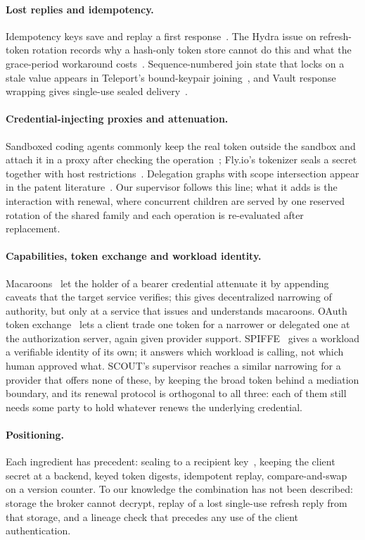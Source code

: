 \documentclass[11pt]{article}
\begin{document}
\paragraph{Lost replies and idempotency.} Idempotency keys save and replay a first response~\cite{stripe}. The Hydra issue on refresh-token rotation records why a hash-only token store cannot do this and what the grace-period workaround costs~\cite{hydra1831}. Sequence-numbered join state that locks on a stale value appears in Teleport's bound-keypair joining~\cite{teleport}, and Vault response wrapping gives single-use sealed delivery~\cite{vaultwrap}.

\paragraph{Credential-injecting proxies and attenuation.} Sandboxed coding agents commonly keep the real token outside the sandbox and attach it in a proxy after checking the operation~\cite{anthropicsandbox}; Fly.io's tokenizer seals a secret together with host restrictions~\cite{tokenizer}. Delegation graphs with scope intersection appear in the patent literature~\cite{us12671588}. Our supervisor follows this line; what it adds is the interaction with renewal, where concurrent children are served by one reserved rotation of the shared family and each operation is re-evaluated after replacement.

\paragraph{Capabilities, token exchange and workload identity.} Macaroons~\cite{macaroons} let the holder of a bearer credential attenuate it by appending caveats that the target service verifies; this gives decentralized narrowing of authority, but only at a service that issues and understands macaroons. OAuth token exchange~\cite{rfc8693} lets a client trade one token for a narrower or delegated one at the authorization server, again given provider support. SPIFFE~\cite{spiffe} gives a workload a verifiable identity of its own; it answers which workload is calling, not which human approved what. SCOUT's supervisor reaches a similar narrowing for a provider that offers none of these, by keeping the broad token behind a mediation boundary, and its renewal protocol is orthogonal to all three: each of them still needs some party to hold whatever renews the underlying credential.

\paragraph{Positioning.} Each ingredient has precedent: sealing to a recipient key~\cite{rfc9180}, keeping the client secret at a backend, keyed token digests, idempotent replay, compare-and-swap on a version counter. To our knowledge the combination has not been described: storage the broker cannot decrypt, replay of a lost single-use refresh reply from that storage, and a lineage check that precedes any use of the client authentication.
\end{document}

